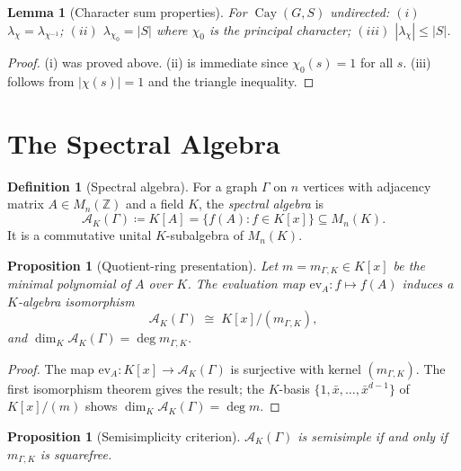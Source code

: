 \documentclass[12pt]{amsart}
\numberwithin{equation}{section}
\theoremstyle{plain}
\newtheorem{lemma}[theorem]{Lemma}
\newtheorem{proposition}[theorem]{Proposition}
\theoremstyle{definition}
\newtheorem{definition}[theorem]{Definition}
\DeclareMathOperator{\Cay}{Cay}
\newcommand{\Z}{\mathbb{Z}}
\newcommand{\calA}{\mathcal{A}}
\begin{document}
\begin{lemma}[Character sum properties]
\label{lem:char-sum}
For $\Cay(G,S)$ undirected: $(i)$ $\lambda_\chi = \lambda_{\chi^{-1}}$;
$(ii)$ $\lambda_{\chi_0} = |S|$ where $\chi_0$ is the principal character;
$(iii)$ $|\lambda_\chi| \le |S|$.
\end{lemma}

\begin{proof}
(i) was proved above.  (ii) is immediate since $\chi_0(s) = 1$ for all $s$.
(iii) follows from $|\chi(s)| = 1$ and the triangle inequality.
\end{proof}

\section{The Spectral Algebra}
\label{sec:specalg}

\begin{definition}[Spectral algebra]
\label{def:spec}
For a graph $\Gamma$ on $n$ vertices with adjacency matrix $A \in M_n(\Z)$
and a field $K$, the \emph{spectral algebra} is
\[
  \calA_K(\Gamma) \coloneqq K[A]
  = \{f(A) : f \in K[x]\} \subseteq M_n(K).
\]
It is a commutative unital $K$-subalgebra of $M_n(K)$.
\end{definition}

\begin{proposition}[Quotient-ring presentation]
\label{prop:quotient}
Let $m = m_{\Gamma,K} \in K[x]$ be the minimal polynomial of $A$ over $K$.
The evaluation map $\mathrm{ev}_A : f \mapsto f(A)$ induces a $K$-algebra
isomorphism
\[
  \calA_K(\Gamma) \;\cong\; K[x]/(m_{\Gamma,K}),
\]
and $\dim_K \calA_K(\Gamma) = \deg m_{\Gamma,K}$.
\end{proposition}

\begin{proof}
The map $\mathrm{ev}_A : K[x] \to \calA_K(\Gamma)$ is surjective with
kernel $(m_{\Gamma,K})$.  The first isomorphism theorem gives the result;
the $K$-basis $\{1, \bar{x}, \ldots, \bar{x}^{d-1}\}$ of $K[x]/(m)$
shows $\dim_K \calA_K(\Gamma) = \deg m$.
\end{proof}

\begin{proposition}[Semisimplicity criterion]
\label{prop:ss}
$\calA_K(\Gamma)$ is semisimple if and only if $m_{\Gamma,K}$ is squarefree.
\end{proposition}
\end{document}

